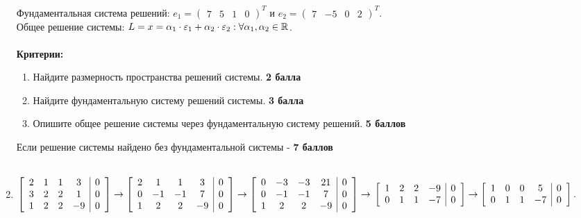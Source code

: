 \documentclass[pdftex,12pt,a4paper]{article}
\begin{document}
\begin{enumerate}
 Фундаментальная система решений: $e_1=\left(\begin{array}{cccc}
 7 & 5 & 1 & 0
 \end{array}\right)^T$ и $e_2=\left(\begin{array}{cccc}
 7 & -5 & 0 & 2
 \end{array}\right)^T$.\\
 Общее решение системы: $L={x=\alpha_1 \cdot \e_1+\alpha_2\cdot \e_2:\forall \alpha_1,\alpha_2 \in \R}$.\\\\
 \textbf{Критерии:}\\
 \begin{enumerate}
 \item Найдите размерность пространства решений системы. \textbf{2 балла}
 \item Найдите фундаментальную систему решений системы. \textbf{3 балла}
 \item Опишите общее решение системы через фундаментальную систему решений. \textbf{5 баллов}
 \end{enumerate}
 Если решение системы найдено без фундаментальной системы - \textbf{7 баллов}\\\\
 \item $\left[ \begin{array}{cccc|c}
2 & 1 & 1 & 3 & 0\\
3 & 2 & 2 & 1 & 0\\
1 & 2 & 2 & -9 & 0
\end{array}\right] \to
\left[ \begin{array}{cccc|c}
2 & 1 & 1 & 3 & 0\\
0 & -1 & -1 & 7 & 0\\
1 & 2 & 2 & -9 & 0
\end{array}\right] \to
\left[ \begin{array}{cccc|c}
0 & -3 & -3 & 21 & 0\\
0 & -1 & -1 & 7 & 0\\
1 & 2 & 2 & -9 & 0
\end{array}\right] \to\\\\
\left[ \begin{array}{cccc|c}
1 & 2 & 2 & -9 & 0\\
0 & 1 & 1 & -7 & 0
\end{array}\right] \to
\left[ \begin{array}{cccc|c}
1 & 0 & 0 & 5 & 0\\
0 & 1 & 1 & -7 & 0
\end{array}\right]$.\\\\

\end{enumerate}
\end{document}
